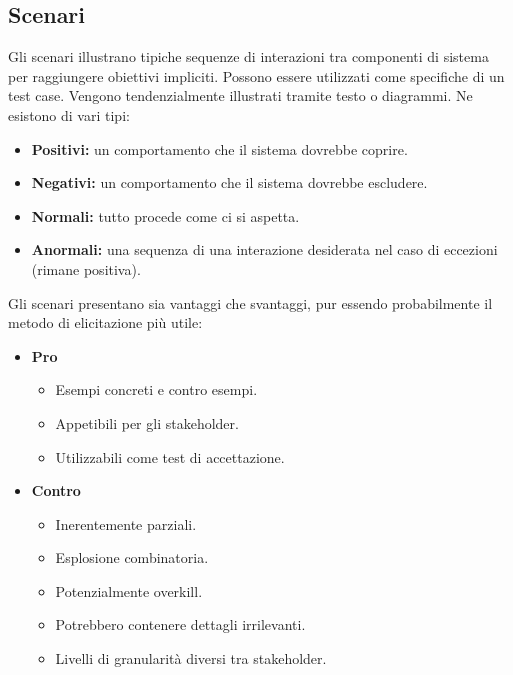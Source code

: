 \documentclass[../main.tex]{subfiles}
\begin{document}
\subsection{Scenari}
Gli scenari illustrano tipiche sequenze di interazioni tra componenti di sistema per raggiungere obiettivi impliciti. Possono essere utilizzati come specifiche di un test case.
Vengono tendenzialmente illustrati tramite testo o diagrammi. Ne esistono di vari tipi:
\begin{itemize}
	\item \textbf{Positivi:} un comportamento che il sistema dovrebbe coprire.
	\item \textbf{Negativi:} un comportamento che il sistema dovrebbe escludere.
	\item \textbf{Normali:} tutto procede come ci si aspetta.
	\item \textbf{Anormali:} una sequenza di una interazione desiderata nel caso di eccezioni (rimane positiva).
\end{itemize}
Gli scenari presentano sia vantaggi che svantaggi, pur essendo probabilmente il metodo di elicitazione più utile:
\begin{itemize}
	\item \textbf{Pro}
	\begin{itemize}
		\item Esempi concreti e contro esempi.
		\item Appetibili per gli stakeholder.
		\item Utilizzabili come test di accettazione.
	\end{itemize}
	\item \textbf{Contro}
	\begin{itemize}
		\item Inerentemente parziali.
		\item Esplosione combinatoria.
		\item Potenzialmente overkill.
		\item Potrebbero contenere dettagli irrilevanti.
		\item Livelli di granularità diversi tra stakeholder.
	\end{itemize}
\end{itemize}
\end{document}

